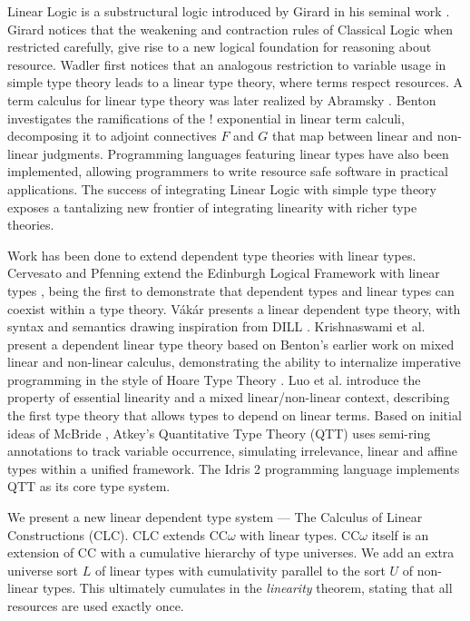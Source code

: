 \documentclass[sigplan,screen]{acmart}
\theoremstyle{definition}
\begin{document}
  Linear Logic is a substructural logic introduced by Girard in his seminal work \cite{girard}. Girard notices that the weakening and contraction rules of Classical Logic when restricted carefully, give rise to a new logical foundation for reasoning about resource. Wadler \cite{wadler1990,wadler1991} first notices that an analogous restriction to variable usage in simple type theory leads to a linear type theory, where terms respect resources. A term calculus for linear type theory was later realized by Abramsky \cite{abramsky1993}. Benton \cite{benton1994} investigates the ramifications of the ! exponential in linear term calculi, decomposing it to adjoint connectives $F$ and $G$ that map between linear and non-linear judgments. Programming languages \cite{l3,ats,linear-haskell} featuring linear types have also been implemented, allowing programmers to write resource safe software in practical applications. The success of integrating Linear Logic with simple type theory exposes a tantalizing new frontier of integrating linearity with richer type theories.

  Work has been done to extend dependent type theories with linear types. Cervesato and Pfenning extend the Edinburgh Logical Framework with linear types \cite{lf,llf}, being the first to demonstrate that dependent types and linear types can coexist within a type theory. V\'{a}k\'{a}r \cite{vakar14} presents a linear dependent type theory, with syntax and semantics drawing inspiration from DILL \cite{dill}.  Krishnaswami et al. present a dependent linear type theory \cite{neel15} based on Benton's earlier work on mixed linear and non-linear calculus, demonstrating the ability to internalize imperative programming in the style of Hoare Type Theory \cite{htt}. Luo et al. introduce the property of essential linearity and a mixed linear/non-linear context, describing the first type theory that allows types to depend on linear terms. Based on initial ideas of McBride \cite{nothing}, Atkey's Quantitative Type Theory (QTT) \cite{qtt} uses semi-ring annotations to track variable occurrence, simulating irrelevance, linear and affine types within a unified framework. The Idris 2 programming language \cite{idris2} implements QTT as its core type system.

  We present a new linear dependent type system --- The Calculus of Linear Constructions (CLC). CLC extends CC$\omega$ with linear types. CC$\omega$ itself is an extension of CC with a cumulative hierarchy of type universes. We add an extra universe sort $L$ of linear types with cumulativity parallel to the sort $U$ of non-linear types. This ultimately cumulates in the \textit{linearity} theorem, stating that all resources are used exactly once.
\end{document}
